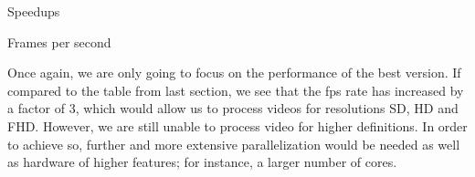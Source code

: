 \documentclass{article}
\begin{document}
\begin{enumerate}[label=5.\arabic*,leftmargin=*]
\begin{table}[h]
    
    \centering
    \caption{Speedups}
\end{table}


\begin{table}[h]
    
    \centering
    \caption{Frames per second}
    \label{fps2}
\end{table}

Once again, we are only going to focus on the performance of the best version. If compared to the table from last section, we see that the fps rate has increased by a factor of 3, which would allow us to process videos for resolutions SD, HD and FHD. However, we are still unable to process video for higher definitions. In order to achieve so, further and more extensive parallelization would be needed as well as hardware of higher features; for instance, a larger number of cores.

\end{enumerate}
\end{document}
